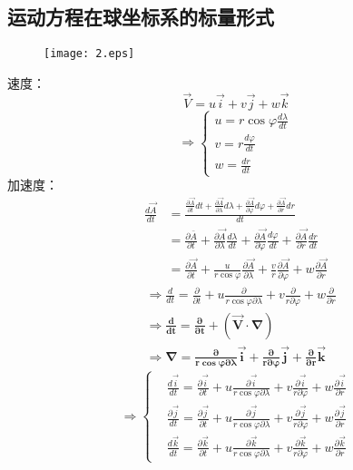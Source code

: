 \documentclass[a4paper,12pt]{article}
\begin{document}
    \subsection{运动方程在球坐标系的标量形式}
    \begin{figure}[H]
        \centering\texttt{[image: 2.eps]}
        \caption*{}
    \end{figure}
    速度：
    \[
        \vec{V}=u\vec{i}+v\vec{j}+w\vec{k}
    \]
    \[
        \Rightarrow
        \left\{\begin{array}{l}u=r \cos \varphi \frac{d \lambda}{d t} \\ v=r \frac{d \varphi}{d t} \\ w=\frac{d r}{d t}\end{array}\right.
    \]
    加速度：
    \[
        \begin{aligned}
        \frac{d\vec{A}}{dt}&=\frac{\frac{\partial \vec{A}}{\partial t} d t+\frac{\partial \vec{A}}{\partial \lambda} d \lambda+\frac{\partial \vec{A}}{\partial \varphi} d \varphi+\frac{\partial \vec{A}}{\partial r} d r}{dt}\\
        &=\frac{\partial \bar{A}}{\partial t}+\frac{\partial \vec{A}}{\partial \lambda} \frac{d \lambda}{d t}+\frac{\partial \vec{A}}{\partial \varphi} \frac{d \varphi}{d t}+\frac{\partial \vec{A}}{\partial r} \frac{d r}{d t}\\
        &=\frac{\partial \vec{A}}{\partial t}+\frac{u}{r \cos \varphi} \frac{\partial \vec{A}}{\partial \lambda}+\frac{v}{r} \frac{\partial \vec{A}}{\partial \varphi}+w \frac{\partial \vec{A}}{\partial r}
        \end{aligned}
    \]
    \[
        \begin{aligned}
        &\Rightarrow\frac{d}{d t}=\frac{\partial}{\partial t}+u \frac{\partial}{r \cos \varphi \partial \lambda}+v \frac{\partial}{r \partial \varphi}+w \frac{\partial}{\partial r}\\
        &\Rightarrow\boxed{\bm{ \frac{d}{d t}=\frac{\partial}{\partial t}+(\vec{V} \cdot \nabla)}}\\
        &\Rightarrow\boxed{\bm{ \nabla=\frac{\partial}{r \cos \varphi \partial \lambda} \vec{i}+\frac{\partial}{r \partial \varphi} \vec{j}+\frac{\partial}{\partial r} \vec{k}}}
        \end{aligned}
    \]
    \[
        \Rightarrow
        \left\{
            \begin{aligned}
                &\frac{d \vec{i}}{d t}=\frac{\partial \vec{i}}{\partial t}+u \frac{\partial \vec{i}}{r \cos \varphi \partial \lambda}+v \frac{\partial \vec{i}}{r \partial \varphi}+w \frac{\partial \vec{i}}{\partial r}\\
                &\frac{\partial \vec{j}}{d t}=\frac{\partial \vec{j}}{\partial t}+u \frac{\partial \vec{j}}{r \cos \varphi \partial \lambda}+v \frac{\partial \vec{j}}{r \partial \varphi}+w \frac{\partial \vec{j}}{\partial r}\\
                &\frac{d \vec{k}}{d t}=\frac{\partial \vec{k}}{\partial t}+u \frac{\partial \vec{k}}{r \cos \varphi \partial \lambda}+v \frac{\partial \vec{k}}{r \partial \varphi}+w \frac{\partial \vec{k}}{\partial r}
            \end{aligned}
        \right.
    \]
\end{document}
